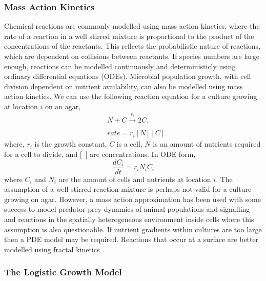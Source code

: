 \begin{multicols}{2}
\subsubsection{Mass Action Kinetics}
Chemical reactions are commonly modelled using mass action kinetics, where the rate of a
reaction in a well stirred mixture is proportional to the product of the concentrations of
the reactants. This reflects the probabilistic nature of reactions, which are dependent on
collisions between reactants. If species numbers are large enough, reactions can be
modelled continuously and deterministicly using ordinary differential equations
(ODEs). Microbial population growth, with cell division dependent on nutrient
availability, can also be modelled using mass action kinetics. We can use the following
reaction equation for a culture growing at location \(i\) on an agar,
\begin{subequations}
  \label{eq:9}
  \begin{align}
    &N + C \xrightarrow[]{r_{i}} 2C,\\
    &rate = r_{i}[N][C]
  \end{align}
\end{subequations}
where, \(r_{i}\) is the growth constant, \(C\) is a cell, \(N\) is an amount of nutrients
required for a cell to divide, and [~] are concentrations. In ODE form,
\begin{equation}
  \label{eq:10}
  \frac{dC_{i}}{dt} = r_{i}N_{i}C_{i}
\end{equation}
where \(C_{i}\) and \(N_{i}\) are the amount of cells and nutrients at location \(i\).
The assumption of a well stirred reaction mixture is perhaps not valid for a culture
growing on agar. However, a mass action approximation has been used with some success to
model predator-prey dynamics of animal populations \citep{Berryman1992} and signalling and
reactions in the spatially heterogeneous environment inside cells
\citet{Aldridge2006,Chen2010} where this assumption is also questionable. If nutrient
gradients within cultures are too large then a PDE model may be required. Reactions that
occur at a surface are better modelled using fractal kinetics \citep{savageau1995}.
\subsubsection{The Logistic Growth Model}


\end{multicols}
